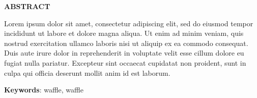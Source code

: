 \thispagestyle{plain}
\begin{center}
    \Large \textbf{\uppercase{Abstract}}
\end{center}

\vspace{3\baselineskip}

\noindent
Lorem ipsum dolor sit amet, consectetur adipiscing elit, sed do eiusmod tempor incididunt ut labore et dolore magna aliqua. Ut enim ad minim veniam, quis nostrud exercitation ullamco laboris nisi ut aliquip ex ea commodo consequat. Duis aute irure dolor in reprehenderit in voluptate velit esse cillum dolore eu fugiat nulla pariatur. Excepteur sint occaecat cupidatat non proident, sunt in culpa qui officia deserunt mollit anim id est laborum.

\vspace{\baselineskip}

\noindent
\textbf{Keywords}: waffle, waffle